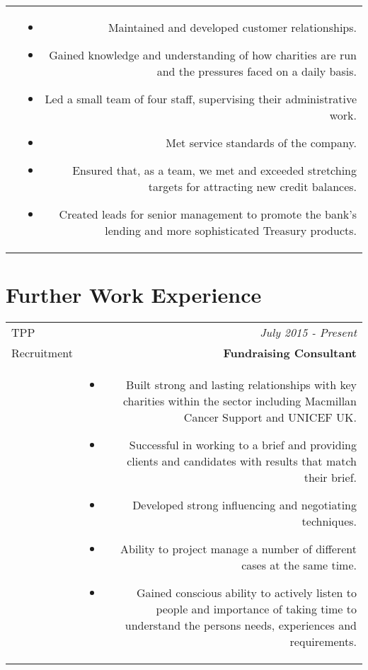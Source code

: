 \documentclass[10pt]{article}
\begin{document}
\begin{flushleft}
\begin{tabular}{L!{\VRule}R}
&\vspace{-2mm}

\begin{itemize} \itemsep1pt \parskip0pt 

\item Maintained and developed customer relationships. 
\item Gained knowledge and understanding of how charities are run and the pressures faced on a daily basis.
\item Led a small team of four staff, supervising their administrative work.
\item Met service standards of the company. 
\item Ensured that, as a team, we met and exceeded stretching targets for attracting new credit balances. 
\item Created leads for senior management to promote the bank’s lending and more sophisticated Treasury products.

\end{itemize}

\end{tabular}



\section*{Further Work Experience}

\begin{tabular}{L!{\VRule}R}

TPP&\textsl{July 2015 - Present}\\
Recruitment&\textbf{Fundraising Consultant}\\

&\vspace{-2mm}

\begin{itemize} \itemsep1pt \parskip0pt 

\item Built strong and lasting relationships with key charities within the sector including Macmillan Cancer Support and UNICEF UK.
\item Successful in working to a brief and providing clients and candidates with results that match their brief.
\item Developed strong influencing and negotiating techniques.
\item Ability to project manage a number of different cases at the same time.
\item Gained conscious ability to actively listen to people and importance of taking time to understand the persons needs, experiences and requirements.


\end{itemize}
\end{tabular}
\end{flushleft}
\end{document}
